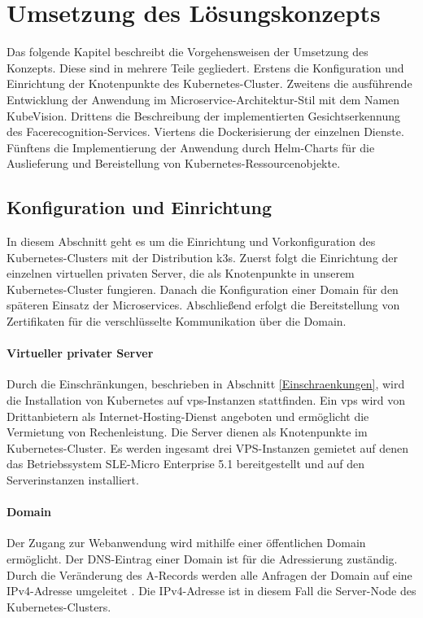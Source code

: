 \chapter{Umsetzung des Lösungskonzepts}\label{Umsetzung}

Das folgende Kapitel beschreibt die Vorgehensweisen der Umsetzung des Konzepts.
Diese sind in mehrere Teile gegliedert.
Erstens die Konfiguration und Einrichtung der Knotenpunkte des Kubernetes-Cluster.
Zweitens die ausführende Entwicklung der Anwendung im Microservice-Architektur-Stil mit dem Namen KubeVision.
Drittens die Beschreibung der implementierten Gesichtserkennung des Facerecognition-Services.
Viertens die Dockerisierung der einzelnen Dienste.
Fünftens die Implementierung der Anwendung durch Helm-Charts für die Auslieferung und Bereistellung von Kubernetes-Ressourcenobjekte. 

\section{Konfiguration und Einrichtung}\label{konfig}

In diesem Abschnitt geht es um die Einrichtung und Vorkonfiguration des Kubernetes-Clusters mit der Distribution k3s.
Zuerst folgt die Einrichtung der einzelnen virtuellen privaten Server, die als Knotenpunkte in unserem Kubernetes-Cluster fungieren.
Danach die Konfiguration einer Domain für den späteren Einsatz der Microservices.
Abschließend erfolgt die Bereitstellung von Zertifikaten für die verschlüsselte Kommunikation über die Domain.

\subsubsection{Virtueller privater Server}

Durch die Einschränkungen, beschrieben in Abschnitt \ref{Einschraenkungen}, wird die Installation von Kubernetes auf \ac{vps}-Instanzen stattfinden.
Ein \acs{vps} wird von Drittanbietern als Internet-Hosting-Dienst angeboten und ermöglicht die Vermietung von Rechenleistung.
Die Server dienen als Knotenpunkte im Kubernetes-Cluster.
Es werden ingesamt drei VPS-Instanzen gemietet auf denen das Betriebssystem SLE-Micro Enterprise 5.1 bereitgestellt und auf den Serverinstanzen installiert.

\subsubsection{Domain}\label{Domain}
Der Zugang zur Webanwendung wird mithilfe einer öffentlichen Domain ermöglicht.
Der DNS-Eintrag einer Domain ist für die Adressierung zuständig.
Durch die Veränderung des A-Records werden alle Anfragen der Domain auf eine IPv4-Adresse umgeleitet \cite{LearningCoreDNS}.
Die IPv4-Adresse ist in diesem Fall die Server-Node des Kubernetes-Clusters.

